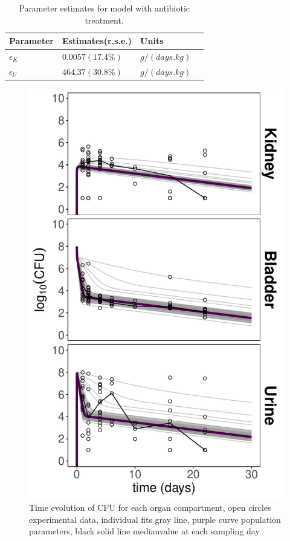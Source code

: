 \documentclass{article}
\begin{document}
\begin{table}
	\begin{tabular}{|l|l|l|l|}
		\hline
		Parameter & Estimates(r.s.e.) & Units\\ \hline
		$\epsilon_{K}$ & $0.0057(17.4\%)$ & $g/(days.kg)$\\
		$\epsilon_{U}$ & $464.37(30.8\%)$ & $g/(days.kg)$\\
		\hline
	\end{tabular}
	\caption{Parameter estimates for model with antibiotic treatment.}
\end{table}

\begin{figure}
	\centering
	\includegraphics[width=\linewidth]{images/plt_final_model_Ct_PAS_vertical.pdf}
	\caption{Time evolution of CFU for each organ compartment, open circles experimental data, individual fits gray line, purple curve population parameters, black solid line medianvalue at each sampling day}
	\label{fig:ModelIndFits}
\end{figure}
\end{document}
